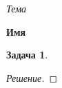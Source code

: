 \documentclass{article}
\newtheorem{problem}{Задача}
\newenvironment{solution}[1][Решение]{\vspace{-\parskip}\begin{proof}[#1]}{\end{proof}}
\begin{document}
\begin{center}
\textit{Тема}

\textbf{Имя}

\end{center}

\begin{problem}

\end{problem}
\begin{solution}

\end{solution}
\end{document}
